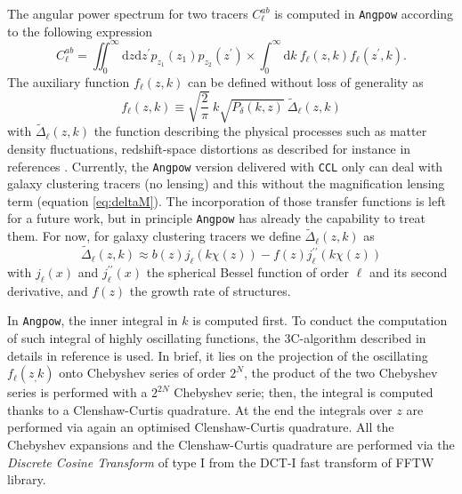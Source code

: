 \documentclass[\docopts]{\docclass}
\newcommand{\ccl}{{\tt CCL}\xspace}
\begin{document}
The angular power spectrum for two tracers $C_{\ell}^{ab}$ is computed in \texttt{Angpow} according to the following expression
\begin{equation}
  C_{\ell}^{ab} = \iint_0^\infty \mathrm{d} z \mathrm{d} z^\prime  p_{z_1}(z_1) p_{z_2}(z^\prime) \times \int_0^\infty \mathrm{d} k\ f_{\ell}(z, k) f_{\ell}(z^\prime, k).
  \label{eq-clz1z2-obs}
\end{equation}
The auxiliary function $f_\ell(z,k)$ can be defined without loss of generality as
\begin{equation}
f_\ell(z,k) \equiv  \sqrt{\frac{2}{\pi}}\  k \sqrt{P_\delta(k,z)}\ \widetilde{\Delta}_\ell(z,k)\label{eq-fell-func}
\end{equation}
with $\widetilde{\Delta}_\ell(z,k)$ the function describing the physical processes such as matter density fluctuations, redshift-space distortions as described for instance in references \citet{2008cmb..book.....D,2009PhRvD..80h3514Y,2010PhRvD..82h3508Y, 2011PhRvD..84d3516C,2011PhRvD..84f3505B}. Currently, the \texttt{Angpow} version delivered with \ccl only can deal with galaxy clustering tracers (no lensing) and this without the magnification lensing term (equation \ref{eq:deltaM}). The incorporation of those transfer functions is left for a future work, but in principle \texttt{Angpow} has already the capability to treat them. For now, for galaxy clustering tracers we define $\widetilde{\Delta}_\ell(z,k)$ as 
\begin{equation}
 \widetilde{\Delta}_\ell(z,k) \approx b(z) j_\ell(k \chi(z)) - f(z) j_\ell^{\prime\prime}(k \chi(z)) 
\end{equation}
with $j_\ell(x)$ and $j_\ell^{\prime\prime}(x)$ the spherical Bessel function of order $\ell$ and its second derivative, and $f(z)$ the growth rate of structures.

In \texttt{Angpow}, the inner integral in $k$ is computed first. 
To conduct the computation of such integral of highly oscillating functions, the 3C-algorithm described in details in reference \citep{2017arXiv170103592C} is used. In brief, it lies on the projection of the oscillating $f_\ell(z_,k)$ onto Chebyshev series of order $2^N$, the product of the two Chebyshev series is performed with a $2^{2N}$ Chebyshev serie; then, the integral is computed thanks to a Clenshaw-Curtis quadrature. At the end the integrals over $z$ are performed via again an optimised Clenshaw-Curtis quadrature. All the Chebyshev expansions and the Clenshaw-Curtis quadrature are performed via the \textit{Discrete Cosine Transform} of type I from the DCT-I fast transform of FFTW library.
\end{document}
